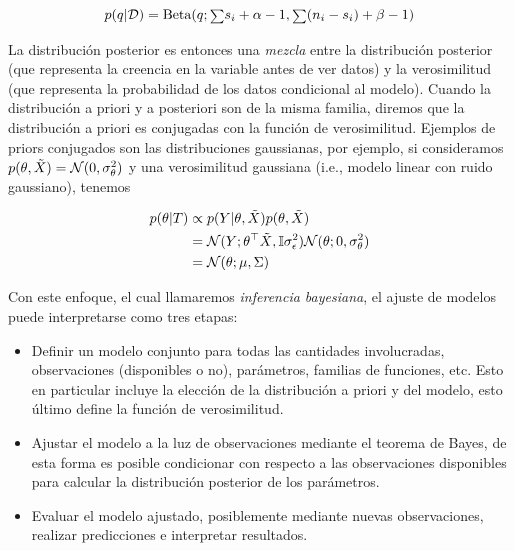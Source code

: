 \begin{equation}
	p(q|{\mathcal D}) = \text{Beta}(q;{\scriptstyle\sum} s_i + \alpha - 1,{\scriptstyle\sum} (n_i-s_i) + \beta-1)
\end{equation}






La distribución posterior es entonces una \emph{mezcla} entre la distribución posterior (que representa la creencia en la variable antes de ver datos) y la verosimilitud (que representa la probabilidad de los datos condicional al modelo). Cuando la distribución a priori y a posteriori son de la misma familia, diremos que  la distribución a priori es conjugadas con la función de verosimilitud. Ejemplos de priors conjugados son las distribuciones gaussianas, por ejemplo, si consideramos $p(\theta,\tilde{X}) = {\mathcal N}(0,\sigma_\theta^2)$ y una verosimilitud gaussiana (i.e., modelo linear con ruido gaussiano), tenemos

\begin{align}
	p(\theta|T)	&\propto p(Y|\theta,\tilde{X})p(\theta,\tilde{X})\label{eq:gaussian_post}\\
				&= {\mathcal N}(Y;\theta^\top\tilde{X},{\mathbb I}\sigma_\epsilon^2){\mathcal N}(\theta;0,\sigma_\theta^2)\nonumber\\
				&={\mathcal N}(\theta; \mu,\Sigma)\nonumber
\end{align}





Con este enfoque, el cual llamaremos \emph{inferencia bayesiana}, el ajuste de modelos puede interpretarse como tres etapas:

\begin{itemize}
	\item Definir un modelo conjunto para todas las cantidades involucradas, observaciones (disponibles o no), parámetros, familias de funciones, etc. Esto en particular incluye la elección de la distribución a priori y del modelo, esto último define la función de verosimilitud.
	\item Ajustar el modelo a la luz de observaciones mediante el teorema de Bayes, de esta forma es posible condicionar con respecto a las observaciones disponibles para calcular la distribución posterior de los parámetros.  
	\item Evaluar el modelo ajustado, posiblemente mediante nuevas observaciones, realizar predicciones e  interpretar resultados.
\end{itemize}



